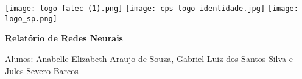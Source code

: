 \documentclass{article}
\begin{document}
\begin{flushright}
\centering %
\texttt{[image: logo-fatec (1).png]} %
\texttt{[image: cps-logo-identidade.jpg]}
\texttt{[image: logo\_sp.png]}
\label{figura:qualquernome}
\end{flushright}

\vspace{5cm}
\begin{center} %
{\bf \huge  Relatório de Redes Neurais}\\[5.1cm] %
\end{center} %

{\large Alunos: Anabelle Elizabeth Araujo de Souza, Gabriel Luiz dos Santos Silva e Jules Severo Barcos}\\[1.0cm] %
\end{document}
